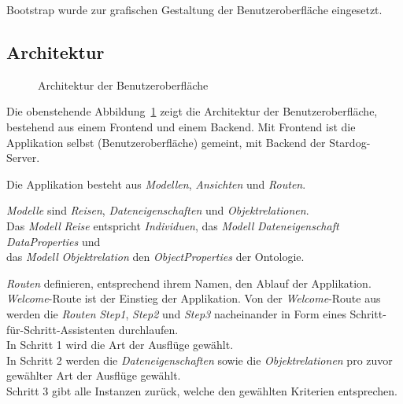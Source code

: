 Bootstrap wurde zur grafischen Gestaltung der Benutzeroberfläche eingesetzt.

\subsection{Architektur}
\label{subsec:komponenten:gui:architektur}
\begin{figure}[H]
    \centering {}
    \caption{Architektur der Benutzeroberfläche\label{fig:architektur:gui}\protect\footnotemark}
\end{figure}

Die obenstehende Abbildung~\ref{fig:architektur:gui} zeigt die Architektur der Benutzeroberfläche, bestehend aus einem Frontend und einem Backend. Mit Frontend ist die Applikation selbst (Benutzeroberfläche) gemeint, mit Backend der Stardog-Server.

Die Applikation besteht aus \textit{Modellen}, \textit{Ansichten} und \textit{Routen}.

\textit{Modelle} sind \textit{Reisen}, \textit{Dateneigenschaften} und \textit{Objektrelationen}.\\
\hangindent=1.5cm Das \textit{Modell} \textit{Reise} entspricht \textit{Individuen}, das \textit{Modell} \textit{Dateneigenschaft} \textit{DataProperties} und\\
das \textit{Modell} \textit{Objektrelation} den \textit{ObjectProperties} der Ontologie.

\textit{Routen} definieren, entsprechend ihrem Namen, den Ablauf der Applikation.\\
\hangindent=1.5cm \textit{Welcome}-Route ist der Einstieg der Applikation. Von der \textit{Welcome}-Route aus werden die \textit{Routen} \textit{Step1}, \textit{Step2} und \textit{Step3} nacheinander in Form eines Schritt-für-Schritt-Assistenten durchlaufen.\\
In Schritt 1 wird die Art der Ausflüge gewählt.\\
In Schritt 2 werden die \textit{Dateneigenschaften} sowie die \textit{Objektrelationen} pro zuvor gewählter Art der Ausflüge gewählt.\\
Schritt 3 gibt alle Instanzen zurück, welche den gewählten Kriterien entsprechen.

